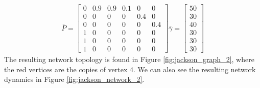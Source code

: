 \documentclass[12pt]{thesis}
\begin{document}
\begin{align*}
    \bar{P} = 
    \begin{bmatrix} 
        0  &  0.9  &  0.9  &  0.1  &    0  &    0 \\
        0  &    0  &    0  &    0  &  0.4  &    0 \\
        0  &    0  &    0  &    0  &    0  &  0.4 \\
        1  &    0  &    0  &    0  &    0  &    0 \\
        1  &    0  &    0  &    0  &    0  &    0 \\
        1  &    0  &    0  &    0  &    0  &    0 
    \end{bmatrix}
    \bar{\gamma} = \begin{bmatrix} 50 \\ 30 \\ 40 \\ 30 \\ 30 \\ 30 \end{bmatrix}
\end{align*}
The resulting network topology is found in Figure \ref{fig:jackson_graph_2}, where the red vertices are the copies of vertex 4.
We can also see the resulting network dynamics in Figure \ref{fig:jackson_network_2}.
\end{document}
